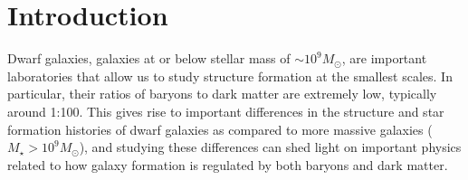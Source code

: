 \documentclass[iop]{emulateapj}
\begin{document}




\section{Introduction}
\label{intro}

Dwarf galaxies, galaxies at or below stellar mass of $\sim 10^{9} M_{\odot}$, are important laboratories that allow us to study structure formation at the smallest scales. In particular, their ratios of baryons to dark matter are extremely low, typically around 1:100. This gives rise to important differences in the structure and star formation histories of dwarf galaxies as compared to more massive galaxies ($ M_{\star} > 10^{9} M_{\odot}$), and studying these differences can shed light on important physics related to how galaxy formation is regulated by both baryons and dark matter.
\end{document}
